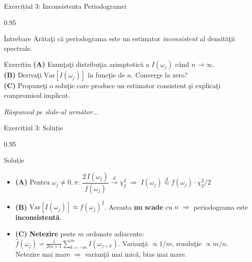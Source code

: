 \documentclass[9pt, aspectratio=169, t]{beamer}
\begin{document}
\begin{frame}{Exercițiul 3: Inconsistența Periodogramei}
    \begin{cminipage}{0.95\textwidth}
    \begin{alertblock}{Întrebare}
        Arătaţi că periodograma este un estimator \emph{inconsistent} al densităţii spectrale.
    \end{alertblock}

    \vspace{0.2cm}

    \begin{block}{Exercițiu}
        \textcolor{MainBlue}{\textbf{(A)}} Enunţaţi distribuţia asimptotică a $I(\omega_j)$ când $n \to \infty$.\\[3pt]
        \textcolor{MainBlue}{\textbf{(B)}} Derivaţi $\text{Var}[I(\omega_j)]$ în funcţie de $n$. Converge la zero?\\[3pt]
        \textcolor{MainBlue}{\textbf{(C)}} Propuneţi o soluţie care produce un estimator consistent şi explicaţi compromisul implicat.
    \end{block}

    \vspace{0.3cm}

    \begin{center}
        \textit{Răspunsul pe slide-ul următor...}
    \end{center}
    \end{cminipage}
\end{frame}

\begin{frame}{Exercițiul 3: Soluție}
    \begin{cminipage}{0.95\textwidth}
    \begin{exampleblock}{Soluție}
        {\footnotesize
        \begin{itemize}\setlength{\itemsep}{0pt}
            \item \textcolor{MainBlue}{\textbf{(A)}} Pentru $\omega_j \neq 0, \pi$:
            $\dfrac{2\,I(\omega_j)}{f(\omega_j)} \xrightarrow{d} \chi^2_2 \;\Rightarrow\; I(\omega_j) \stackrel{d}{\approx} f(\omega_j)\cdot\chi^2_2/2$
            \item \textcolor{MainBlue}{\textbf{(B)}} $\text{Var}[I(\omega_j)] \approx f(\omega_j)^2$. Aceasta \textbf{nu scade} cu $n$ $\Rightarrow$ periodograma este \textbf{inconsistentă}.
            \item \textcolor{MainBlue}{\textbf{(C)}} \textbf{Netezire} peste $m$ ordonate adiacente:
            $\hat{f}(\omega_j) = \frac{1}{2m+1}\sum_{k=-m}^{m} I(\omega_{j+k})$.
            Varianţă $\propto 1/m$, rezoluţie $\propto m/n$. Netezire mai mare $\Rightarrow$ varianţă mai mică, bias mai mare.
        \end{itemize}
        }
    \end{exampleblock}
    \end{cminipage}
\end{frame}
\end{document}
